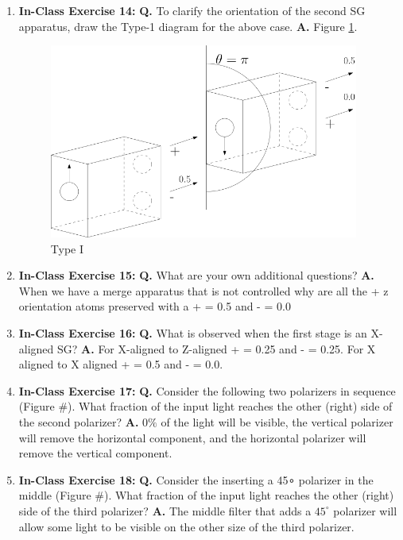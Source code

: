 \documentclass[main.tex]{subfiles}
\begin{document}
\begin{enumerate}
\item[] \textbf{In-Class Exercise 14:} \textbf{Q.} To clarify the orientation of the second SG apparatus, draw the Type-1 diagram for the above case. \textbf{A.} Figure \ref{fig:e14_Type_I}.

    \begin{figure}
        \centering
        \includegraphics[width=4in]{modules/figs/m01/e14_Type_I.png}
        \caption{Type I}
        \label{fig:e14_Type_I}
    \end{figure}

\item[] \textbf{In-Class Exercise 15:} \textbf{Q.} What are your own additional questions? \textbf{A.} When we have a merge apparatus that is not controlled why are all the + z orientation atoms preserved with a + = 0.5 and - = 0.0

\item[] \textbf{In-Class Exercise 16:} \textbf{Q.} What is observed when the first stage is an X-aligned SG? \textbf{A.} For X-aligned to Z-aligned + = 0.25 and - = 0.25. For X aligned to X aligned + = 0.5 and - = 0.0.

\item[] \textbf{In-Class Exercise 17:} \textbf{Q.} Consider the following two polarizers in sequence (Figure #). What fraction of the input light reaches the other (right) side of the second polarizer? \textbf{A.} $0\%$ of the light will be visible, the vertical polarizer will remove the horizontal component, and the horizontal polarizer will remove the vertical component.

\item[] \textbf{In-Class Exercise 18:} \textbf{Q.} Consider the inserting a 45∘ polarizer in the middle (Figure #). What fraction of the input light reaches the other (right) side of the third polarizer? \textbf{A.} The middle filter that adds a $45^{\circ}$ polarizer will allow some light to be visible on the other size of the third polarizer.


\end{enumerate}
\end{document}
